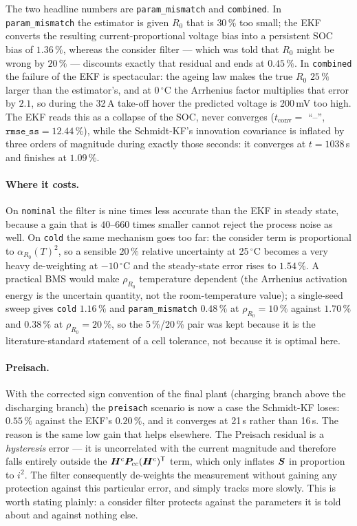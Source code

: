 The two headline numbers are \texttt{param\_mismatch} and \texttt{combined}.  In
\texttt{param\_mismatch} the estimator is given $R_0$ that is $30\,\%$ too small; the EKF converts
the resulting current-proportional voltage bias into a persistent SOC bias of $1.36\,\%$, whereas
the consider filter --- which was told that $R_0$ might be wrong by $20\,\%$ --- discounts exactly
that residual and ends at $0.45\,\%$.  In \texttt{combined} the failure of the EKF is spectacular:
the ageing law makes the true $R_0$ $25\,\%$ larger than the estimator's, and at
0\,\ensuremath{{}^\circ}C the Arrhenius factor multiplies that error by $2.1$, so during the
32\,A take-off hover the predicted voltage is 200\,mV too high.  The EKF reads this as a collapse
of the SOC, never converges ($t_\mathrm{conv}=$ ``--'', $\texttt{rmse\_ss}=12.44\,\%$), while the
Schmidt-KF's innovation covariance is inflated by three orders of magnitude during exactly those
seconds: it converges at $t=1038$\,s and finishes at $1.09\,\%$.

\paragraph{Where it costs.}  On \texttt{nominal} the filter is nine times less accurate than the
EKF in steady state, because a gain that is $40$--$660$ times smaller cannot reject the process
noise as well.  On \texttt{cold} the same mechanism goes too far: the consider term is proportional
to $\alpha_{R_0}(T)^2$, so a sensible $20\,\%$ relative uncertainty at 25\,\ensuremath{{}^\circ}C
becomes a very heavy de-weighting at $-10$\,\ensuremath{{}^\circ}C and the steady-state error
rises to $1.54\,\%$.  A practical BMS would make $\rho_{R_0}$ temperature dependent (the Arrhenius
activation energy is the uncertain quantity, not the room-temperature value); a single-seed sweep
gives \texttt{cold} $1.16\,\%$ and \texttt{param\_mismatch} $0.48\,\%$ at $\rho_{R_0}=10\,\%$
against $1.70\,\%$ and $0.38\,\%$ at $\rho_{R_0}=20\,\%$, so the 5\,\%/20\,\% pair was kept because
it is the literature-standard statement of a cell tolerance, not because it is optimal here.

\paragraph{Preisach.}  With the corrected sign convention of the final plant (charging branch above
the discharging branch) the \texttt{preisach} scenario is now a case the Schmidt-KF loses:
$0.55\,\%$ against the EKF's $0.20\,\%$, and it converges at 21\,s rather than 16\,s.  The reason is
the same low gain that helps elsewhere.  The Preisach residual is a \emph{hysteresis} error --- it
is uncorrelated with the current magnitude and therefore falls entirely outside the
$\bm{H}^c\bm{P}_{cc}(\bm{H}^c)^{\mathsf{T}}$ term, which only inflates $\bm{S}$ in proportion to $i^2$.  The filter
consequently de-weights the measurement without gaining any protection against this particular
error, and simply tracks more slowly.  This is worth stating plainly: a consider filter protects
against the parameters it is told about and against nothing else.

